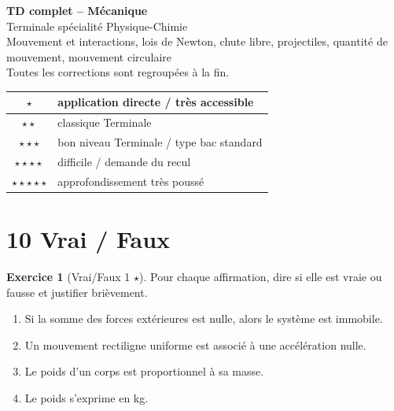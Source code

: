 \documentclass[11pt,a4paper]{article}
\theoremstyle{definition}
\newtheorem{exercice}{Exercice}[section]
\newcommand{\etoiles}[1]{\hfill{\small\textbf{#1}}}
\begin{document}
\begin{center}
    {\LARGE \textbf{TD complet -- Mécanique}}\\[0.2cm]
    {\large Terminale spécialité Physique-Chimie}\\[0.2cm]
    {\small Mouvement et interactions, lois de Newton, chute libre, projectiles, quantité de mouvement, mouvement circulaire}\\[0.2cm]
    {\small Toutes les corrections sont regroupées à la fin.}
\end{center}

\vspace{0.3cm}

\begin{center}
\renewcommand{\arraystretch}{1.3}
\begin{tabular}{|c|l|}
\hline
$\star$ & application directe / très accessible \\
\hline
$\star\star$ & classique Terminale \\
\hline
$\star\star\star$ & bon niveau Terminale / type bac standard \\
\hline
$\star\star\star\star$ & difficile / demande du recul \\
\hline
$\star\star\star\star\star$ & approfondissement très poussé \\
\hline
\end{tabular}
\end{center}

\tableofcontents
\newpage

\section{10 Vrai / Faux}

\begin{exercice}[Vrai/Faux 1 \etoiles{$\star$}]
Pour chaque affirmation, dire si elle est vraie ou fausse et justifier brièvement.
\begin{enumerate}[label=\alph*)]
    \item Si la somme des forces extérieures est nulle, alors le système est immobile.
    \item Un mouvement rectiligne uniforme est associé à une accélération nulle.
    \item Le poids d’un corps est proportionnel à sa masse.
    \item Le poids s’exprime en \si{kg}.
\end{enumerate}
\end{exercice}
\end{document}
